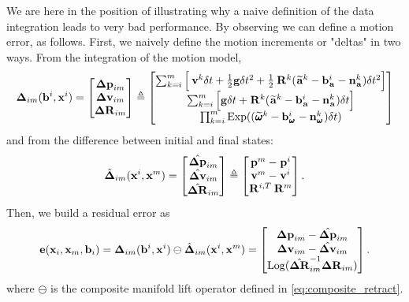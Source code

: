 We are here in the position of illustrating why a naive definition of the data integration leads to very bad performance. 
By observing  we can define a motion error, as follows. 
First, we naively define the motion increments or "deltas"
%
%
in two ways. 
From the integration of the motion model, %
%
\begin{align}
    {{\bm \Delta}}_{im}({\bf b}^i, {\bf x}^i) = 
    \begin{bmatrix}
    {\bm \Delta {\bf p}}_{im}\\ {\bm \Delta {\bf v}}_{im}\\ {\bm \Delta {\bf R}}_{im}
    \end{bmatrix} \triangleq
    \begin{bmatrix}
    \sum_{k=i}^{m} \Big[\prescript{}{}{{\bf v}}_{}^{k}\delta t + \frac{1}{2}{\bf g} \delta t^2 
    + \frac{1}{2}\prescript{}{}{{\bf R}}_{}^{k}(\prescript{}{}{\widetilde{{\bf a}}}_{}^k - {\bf b}_{\prescript{}{}{{\bf a}}_{}}^i - {\bf n}_{\prescript{}{}{{\bf a}}_{}}^k)\delta t^2 \Big] \\
    \sum_{k=i}^{m} \Big[{\bf g} \delta t + \prescript{}{}{{\bf R}}_{}^{k}(\prescript{}{}{\widetilde{{\bf a}}}_{}^k - {\bf b}_{\prescript{}{}{{\bf a}}_{}}^i - {\bf n}_{\prescript{}{}{{\bf a}}_{}}^k)\delta t \Big]  \\
    \prod_{k=i}^{m} \operatorname*{Exp}((\prescript{}{}{\widetilde{\pmb{\omega}}}_{}^k - {\bf b}_{\prescript{}{}{\pmb{\omega}}_{}}^i- {\bf n}_{\prescript{}{}{\pmb{\omega}}_{}}^k)\delta t)  
    \end{bmatrix}
    \label{eq:imu_delta_naive}
\end{align}
%
and from the difference between initial and final states:
%
\begin{align}
    \hat{{{\bm \Delta}}}_{im}({\bf x}^i, {\bf x}^m) = 
    \begin{bmatrix}
    \hat{{\bm \Delta {\bf p}}}_{im}\\ \hat{{\bm \Delta {\bf v}}}_{im}\\ \hat{{\bm \Delta {\bf R}}}_{im}
    \end{bmatrix} \triangleq
    \begin{bmatrix}
    \prescript{}{}{{\bf p}}_{}^{m} - \prescript{}{}{{\bf p}}_{}^{i} \\
    \prescript{}{}{{\bf v}}_{}^{m}  - \prescript{}{}{{\bf v}}_{}^{i}  \\
    \prescript{}{}{{\bf R}}_{}^{i,T} \prescript{}{}{{\bf R}}_{}^{m}  
    \end{bmatrix}.
\end{align}
%
Then, we build a residual error as
%
\begin{equation}
    {\bf e}({\bf x}_i, {\bf x}_m, {\bf b}_i) 
    = {{\bm \Delta}}_{im}({\bf b}^i, {\bf x}^i) \ominus \hat{{{\bm \Delta}}}_{im}({\bf x}^i, {\bf x}^m) =
    \begin{bmatrix}
    {\bm \Delta {\bf p}}_{im} - \hat{{\bm \Delta {\bf p}}}_{im} \\ 
    {\bm \Delta {\bf v}}_{im} - \hat{{\bm \Delta {\bf v}}}_{im} \\ 
    \operatorname*{Log}(\hat{{\bm \Delta {\bf R}}}_{im}^{-1} {\bm \Delta {\bf R}}_{im}) 
    \end{bmatrix}.
    \label{eq:error_naive_pre-integration}
\end{equation}
%
where $\ominus$ is the composite manifold lift operator defined in \ref{eq:composite_retract}.

